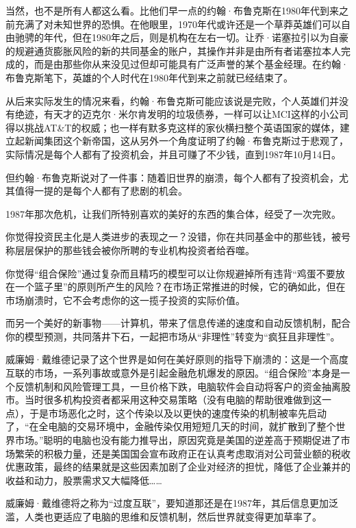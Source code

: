当然，也不是所有人都这么看。比他们早一点的约翰·布鲁克斯在1980年代到来之前充满了对未知世界的恐惧。在他眼里，1970年代或许还是一个草莽英雄们可以自由驰骋的年代，但在1980年之后，则是机构在左右一切。让乔·诺塞拉引以为自豪的规避通货膨胀风险的新的共同基金的账户，其操作并非是由所有者诺塞拉本人完成的，而是由那些你从来没见过但却可能具有广泛声誉的某个基金经理。在约翰·布鲁克斯笔下，英雄的个人时代在1980年代到来之前就已经结束了。

从后来实际发生的情况来看，约翰·布鲁克斯可能应该说是完败，个人英雄们并没有绝迹，有天才的迈克尔·米尔肯发明的垃圾债券，一样可以让MCI这样的小公司得以挑战AT\&T的权威；也一样有默多克这样的家伙横扫整个英语国家的媒体，建立起新闻集团这个新帝国，这从另外一个角度证明了约翰·布鲁克斯过于悲观了，实际情况是每个人都有了投资机会，并且可赚了不少钱，直到1987年10月14日。

但约翰·布鲁克斯说对了一件事：随着旧世界的崩溃，每个人都有了投资机会，尤其值得一提的是每个人都有了悲剧的机会。

1987年那次危机，让我们所特别喜欢的美好的东西的集合体，经受了一次完败。

你觉得投资民主化是人类进步的表现之一？没错，你在共同基金中的那些钱，被号称层层保护的那些钱会被你所聘的专业机构投资者给吞噬。

你觉得``组合保险''通过复杂而且精巧的模型可以让你规避掉所有违背``鸡蛋不要放在一个篮子里''的原则所产生的风险？在市场正常推进的时候，它的确如此，但在市场崩溃时，它不会考虑你的这一揽子投资的实际价值。

而另一个美好的新事物------计算机，带来了信息传递的速度和自动反馈机制，配合你的模型预测，共同落井下石，一起把市场从``非理性''转变为``疯狂且非理性''。

威廉姆·戴维德记录了这个世界是如何在美好原则的指导下崩溃的：这是一个高度互联的市场，一系列事故或意外是引起金融危机爆发的原因。``组合保险''本身是一个反馈机制和风险管理工具，一旦价格下跌，电脑软件会自动将客户的资金抽离股市。当时很多机构投资者都采用这种交易策略（没有电脑的帮助很难做到这一点），于是市场恶化之时，这个传染以及以更快的速度传染的机制被率先启动了，``在全电脑的交易环境中，金融传染仅用短短几天的时间，就扩散到了整个世界市场。''聪明的电脑也没有能力推导出，原因究竟是美国的逆差高于预期促进了市场繁荣的积极力量，还是美国国会宣布政府正在认真考虑取消对公司营业额的税收优惠政策，最终的结果就是这些因素加剧了企业对经济的担忧，降低了企业兼并的收益和动力，股票需求又大幅降低\ldots\ldots{}

威廉姆·戴维德将之称为``过度互联''，要知道那还是在1987年，其后信息更加泛滥，人类也更适应了电脑的思维和反馈机制，然后世界就变得更加草率了。

